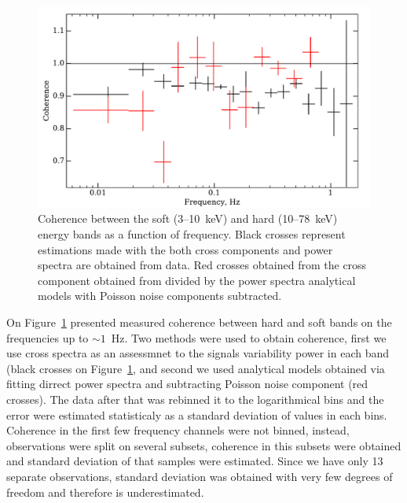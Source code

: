 \documentclass[a4paper,fleqn,usenatbib]{mnras}
\begin{document}
\begin{table}
\begin{figure}
    \includegraphics[width=\columnwidth]{coherence_3.pdf}
    \caption{Coherence between the soft (3--10~keV) and hard (10--78~keV) energy bands as a function of frequency. 
     Black crosses  represent estimations made with the both cross components and power spectra are obtained from data.
     Red crosses obtained from the cross component obtained from divided by the power spectra analytical models with Poisson noise components subtracted.}
    \label{fig:coherence}
\end{figure}


On Figure~\ref{fig:coherence} presented measured coherence between hard and soft bands on the frequencies up to $\sim1$~Hz. 
Two methods were used to obtain coherence, first we use cross spectra as an assessmnet to the signals variability power in each band (black crosses on Figure~\ref{fig:coherence}, and second we used analytical models obtained via fitting dirrect power spectra and subtracting Poisson noise component (red crosses). 
The data after that was rebinned it to the logarithmical bins and the error were estimated statisticaly as a standard deviation of values in each bins. 
Coherence in the first few frequency channels were not binned, instead, observations were split on several subsets, coherence in this subsets were obtained and standard deviation of that samples were estimated.
Since we have only 13 separate observations, standard deviation was obtained with very few degrees of freedom and therefore is underestimated. 


\end{table}
\end{document}
